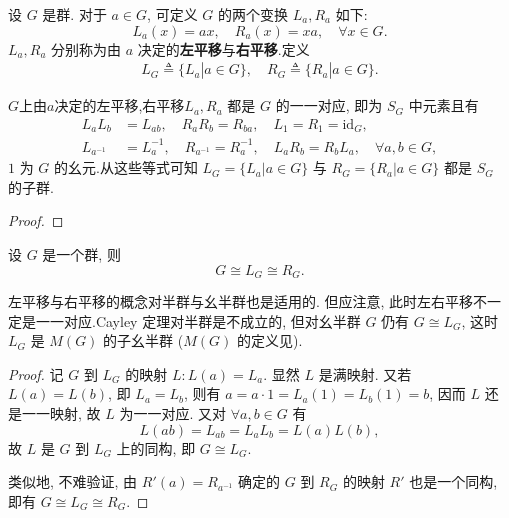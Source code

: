 \documentclass[../../main.tex]{subfiles}
\begin{document}
\begin{definition}
设 \( G \) 是群. 对于 \( a \in G \), 可定义 \( G \) 的两个变换 \( L_a, R_a \) 如下:
\[
L_a(x) = ax, \quad R_a(x) = xa, \quad \forall x \in G.
\]
\( L_a, R_a \) 分别称为由 \( a \) 决定的\textbf{左平移}与\textbf{右平移}.定义
\begin{align*}
L_G\triangleq \{L_a|a\in G\},\quad R_G\triangleq \{R_a|a\in G\}.
\end{align*}
\end{definition}

\begin{proposition}
$G$上由$a$决定的左平移,右平移\( L_a, R_a \) 都是 \( G \) 的一一对应, 即为 \( S_G \) 中元素且有
\begin{align*}
L_aL_b &= L_{ab}, \quad R_aR_b = R_{ba}, \quad L_1 = R_1 = \text{id}_G, \\
L_{a^{-1}} &= L_a^{-1}, \quad R_{a^{-1}} = R_a^{-1}, \quad L_aR_b = R_bL_a, \quad \forall a,b \in G,
\end{align*}
\( 1 \) 为 \( G \) 的幺元.从这些等式可知 \( L_G = \{L_a|a \in G\} \) 与 \( R_G = \{R_a|a \in G\} \) 都是 \( S_G \) 的子群.
\end{proposition}
\begin{proof}

\end{proof}

\begin{theorem}[Cayley定理]\label{theorem:抽象代数-Cayley定理-定理 1.5.1}
设 \( G \) 是一个群, 则
\[
G \cong L_G \cong R_G.
\]
\end{theorem}
\begin{remark}
左平移与右平移的概念对半群与幺半群也是适用的. 但应注意, 此时左右平移不一定是一一对应.Cayley 定理对半群是不成立的, 但对幺半群 \( G \) 仍有 \( G \cong L_G \), 这时 \( L_G \) 是 \( M(G) \) 的子幺半群 (\( M(G) \) 的定义见).
\end{remark}
\begin{proof}
记 \( G \) 到 \( L_G \) 的映射 \( L: L(a) = L_a \). 显然 \( L \) 是满映射. 又若 \( L(a) = L(b) \), 即 \( L_a = L_b \), 则有 \( a = a \cdot 1 = L_a(1) = L_b(1) = b \), 因而 \( L \) 还是一一映射, 故 \( L \) 为一一对应. 又对 \( \forall a,b \in G \) 有
\[
L(ab) = L_{ab} = L_aL_b = L(a)L(b),
\]
故 \( L \) 是 \( G \) 到 \( L_G \) 上的同构, 即 \( G \cong L_G \).

类似地, 不难验证, 由 \( R'(a) = R_{a^{-1}} \) 确定的 \( G \) 到 \( R_G \) 的映射 \( R' \) 也是一个同构, 即有 \( G \cong L_G \cong R_G \).
\end{proof}
\end{document}
